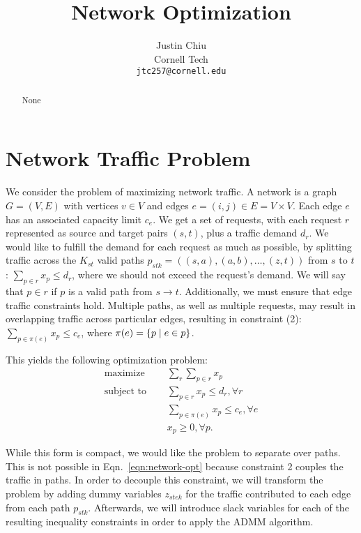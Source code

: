 \documentclass[11pt]{article}
\title{Network Optimization}
\author{Justin Chiu \\
  Cornell Tech \\
  \texttt{jtc257@cornell.edu}}
\begin{document}
\maketitle
\begin{abstract}
None
\end{abstract}

\section{Network Traffic Problem}
We consider the problem of maximizing network traffic.
A network is a graph $G = (V,E)$ with vertices $v\in V$ and edges
$e = (i,j)\in E = V\times V$.
Each edge $e$ has an associated capacity limit $c_e$.
We get a set of requests,
with each request $r$ represented as source and target pairs $(s,t)$,
plus a traffic demand $d_r$.
We would like to fulfill the demand for each request as much as possible,
by splitting traffic across the $K_{st}$ valid paths
$p_{stk} = ((s,a), (a,b), \ldots, (z,t))$ from $s$ to $t$:
$\sum_{p\in r} x_p \le d_r$, where we should not exceed the request's demand.
We will say that $p\in r$ if $p$ is a valid path from $s\to t$.
Additionally, we must ensure that edge traffic constraints hold.
Multiple paths, as well as multiple requests, may result in overlapping traffic
across particular edges, resulting in constraint (2):
$\sum_{p\in\pi(e)} x_{p} \le c_e$,
where $\pi(e) = \left\{p \mid e \in p\right\}$.

This yields the following optimization problem:
\begin{equation}
\label{eqn:network-opt}
\begin{aligned}
\textrm{maximize } \quad & \sum_r \sum_{p\in r} x_p\\
\textrm{subject to } \quad
&\sum_{p \in r}x_p \le d_r, \forall r\\
&\sum_{p\in\pi(e)} x_p \le c_e, \forall e\\
& x_p \geq 0, \forall p.
\end{aligned}
\end{equation}

While this form is compact, we would like the problem to
separate over paths. This is not possible in Eqn.~\ref{eqn:network-opt}
because constraint 2 couples the traffic in paths.
In order to decouple this constraint, we will transform the problem by adding dummy
variables $z_{stek}$ for the traffic contributed to each edge from each path $p_{stk}$.
Afterwards, we will introduce slack variables for each of the resulting inequality constraints
in order to apply the ADMM algorithm.
\end{document}
